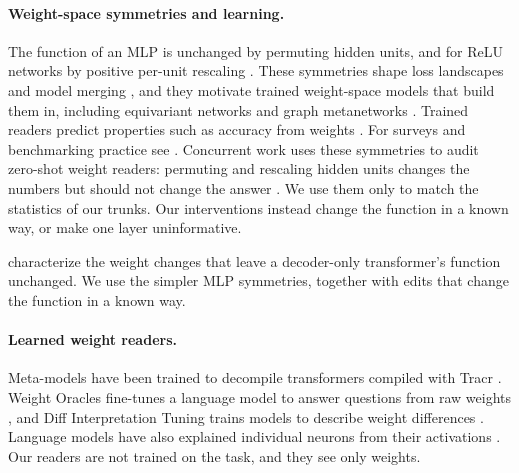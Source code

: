 \documentclass[10pt]{article}
\begin{document}
\paragraph{Weight-space symmetries and learning.} The function of an MLP is unchanged by permuting hidden units, and for ReLU networks by positive per-unit rescaling \citep{hechtnielsen1990,neyshabur2015pathsgd,dinh2017sharp}. These symmetries shape loss landscapes and model merging \citep{entezari2022role,ainsworth2023gitrebasin}, and they motivate trained weight-space models that build them in, including equivariant networks and graph metanetworks \citep{navon2023equivariant,zhou2023nfn,lim2024graph,kofinas2024graph,graphmetanets2026}. Trained readers predict properties such as accuracy from weights \citep{unterthiner2020predicting,schurholt2022modelzoos}. For surveys and benchmarking practice see \citet{wslsurvey2026,wslbenchmark2026}. Concurrent work uses these symmetries to audit zero-shot weight readers: permuting and rescaling hidden units changes the numbers but should not change the answer \citep{cha2026orbit,liu2026computation}. We use them only to match the statistics of our trunks. Our interventions instead change the function in a known way, or make one layer uninformative.

\citet{graphmetanets2026} characterize the weight changes that leave a decoder-only transformer's function unchanged. We use the simpler MLP symmetries, together with edits that change the function in a known way.

\paragraph{Learned weight readers.} Meta-models have been trained to decompile transformers compiled with Tracr \citep{lindner2023tracr,langosco2024metamodels}. Weight Oracles fine-tunes a language model to answer questions from raw weights \citep{weightoracles2026}, and Diff Interpretation Tuning trains models to describe weight differences \citep{goel2025dit}. Language models have also explained individual neurons from their activations \citep{bills2023explain}. Our readers are not trained on the task, and they see only weights.
\end{document}
